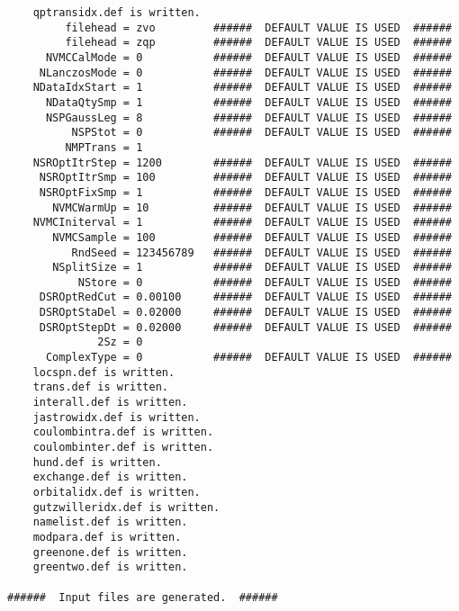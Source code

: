 \begin{verbatim}
    qptransidx.def is written.
         filehead = zvo         ######  DEFAULT VALUE IS USED  ######
         filehead = zqp         ######  DEFAULT VALUE IS USED  ######
      NVMCCalMode = 0           ######  DEFAULT VALUE IS USED  ######
     NLanczosMode = 0           ######  DEFAULT VALUE IS USED  ######
    NDataIdxStart = 1           ######  DEFAULT VALUE IS USED  ######
      NDataQtySmp = 1           ######  DEFAULT VALUE IS USED  ######
      NSPGaussLeg = 8           ######  DEFAULT VALUE IS USED  ######
          NSPStot = 0           ######  DEFAULT VALUE IS USED  ######
         NMPTrans = 1         
    NSROptItrStep = 1200        ######  DEFAULT VALUE IS USED  ######
     NSROptItrSmp = 100         ######  DEFAULT VALUE IS USED  ######
     NSROptFixSmp = 1           ######  DEFAULT VALUE IS USED  ######
       NVMCWarmUp = 10          ######  DEFAULT VALUE IS USED  ######
    NVMCIniterval = 1           ######  DEFAULT VALUE IS USED  ######
       NVMCSample = 100         ######  DEFAULT VALUE IS USED  ######
          RndSeed = 123456789   ######  DEFAULT VALUE IS USED  ######
       NSplitSize = 1           ######  DEFAULT VALUE IS USED  ######
           NStore = 0           ######  DEFAULT VALUE IS USED  ######
     DSROptRedCut = 0.00100     ######  DEFAULT VALUE IS USED  ######
     DSROptStaDel = 0.02000     ######  DEFAULT VALUE IS USED  ######
     DSROptStepDt = 0.02000     ######  DEFAULT VALUE IS USED  ######
              2Sz = 0  
      ComplexType = 0           ######  DEFAULT VALUE IS USED  ######
    locspn.def is written.
    trans.def is written.
    interall.def is written.
    jastrowidx.def is written.
    coulombintra.def is written.
    coulombinter.def is written.
    hund.def is written.
    exchange.def is written.
    orbitalidx.def is written.
    gutzwilleridx.def is written.
    namelist.def is written.
    modpara.def is written.
    greenone.def is written.
    greentwo.def is written.

######  Input files are generated.  ######
\end{verbatim}
\normalsize

